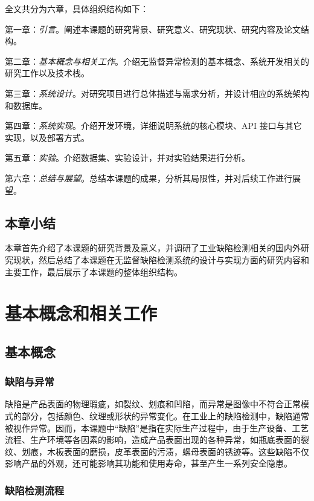 \documentclass[
  ]{njuthesis}
\begin{document}
全文共分为六章，具体组织结构如下：  

第一章：\textit{引言}。阐述本课题的研究背景、研究意义、研究现状、研究内容及论文结构。

第二章：\textit{基本概念与相关工作}。介绍无监督异常检测的基本概念、系统开发相关的研究工作以及技术栈。

第三章：\textit{系统设计}。对研究项目进行总体描述与需求分析，并设计相应的系统架构和数据库。

第四章：\textit{系统实现}。介绍开发环境，详细说明系统的核心模块、API 接口与其它实现，以及部署方式。

第五章：\textit{实验}。介绍数据集、实验设计，并对实验结果进行分析。

第六章：\textit{总结与展望}。总结本课题的成果，分析其局限性，并对后续工作进行展望。 

\section{本章小结}

本章首先介绍了本课题的研究背景及意义，并调研了工业缺陷检测相关的国内外研究现状，然后总结了本课题在无监督缺陷检测系统的设计与实现方面的研究内容和主要工作，最后展示了本课题的整体组织结构。

\chapter{基本概念和相关工作}

\section{基本概念}

\subsection{缺陷与异常}

缺陷是产品表面的物理瑕疵，如裂纹、划痕和凹陷，而异常是图像中不符合正常模式的部分，包括颜色、纹理或形状的异常变化\cite{[9]}。在工业上的缺陷检测中，缺陷通常被视作异常。因而，本课题中“缺陷”是指在实际生产过程中，由于生产设备、工艺流程、生产环境等各因素的影响，造成产品表面出现的各种异常\cite{[10]}，如瓶底表面的裂纹、划痕，木板表面的磨损，皮革表面的污渍，螺母表面的锈迹等。这些缺陷不仅影响产品的外观，还可能影响其功能和使用寿命，甚至产生一系列安全隐患。

\subsection{缺陷检测流程}
\end{document}
